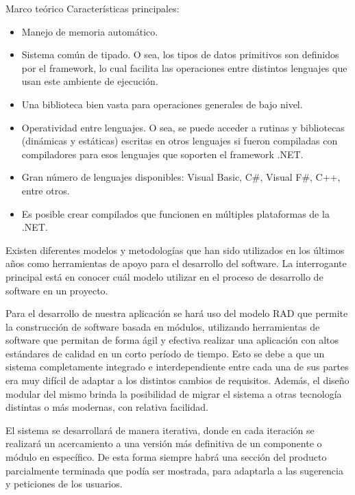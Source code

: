 \begin{thesischapter}{1} {Marco teórico}
    \vspace{2pt}
    Características principales:
    \begin{itemize}
        \item Manejo de memoria automático.
        \item Sistema común de tipado. O sea, los tipos de datos primitivos son definidos por el framework, lo cual facilita las operaciones entre distintos lenguajes que usan este ambiente de ejecución.
        \item Una biblioteca bien vasta para operaciones generales de bajo nivel.
        \item Operatividad entre lenguajes. O sea, se puede acceder a rutinas y bibliotecas (dinámicas y estáticas) escritas en otros lenguajes si fueron compiladas con compiladores para esos lenguajes que soporten el framework .NET.
        \item Gran número de lenguajes disponibles: Visual Basic, C\#, Visual F\#, C++, entre otros.
        \item Es posible crear compilados que funcionen en múltiples plataformas de la .NET.
    \end{itemize}

    Existen diferentes modelos y metodologías que han sido utilizados en los últimos años como 
    herramientas de apoyo para el desarrollo del software. La interrogante principal está en 
    conocer cuál modelo utilizar en el proceso de desarrollo de software en un proyecto.~\cite{DELGADOOLIVERA2021}
    
    \vspace{2pt}
    Para el desarrollo de nuestra aplicación se hará uso del modelo RAD que permite la construcción de software basada en
    módulos, utilizando herramientas de software que permitan de forma ágil y efectiva realizar una
    aplicación con altos estándares de calidad en un corto período de tiempo. Esto se debe a que un sistema completamente integrado e interdependiente entre cada una de sus
    partes era muy difícil de adaptar a los distintos cambios de requisitos. Además,
    el diseño modular del mismo brinda la posibilidad de migrar el sistema a otras
    tecnología distintas o más modernas, con relativa facilidad.
    
    \vspace{2pt}
    El sistema se desarrollará de manera iterativa, donde en cada iteración se
    realizará un acercamiento a una versión más definitiva de un componente o
    módulo en específico. De esta forma siempre habrá una sección del producto
    parcialmente terminada que podía ser mostrada, para adaptarla a las
    sugerencia y peticiones de los usuarios.

\end{thesischapter}